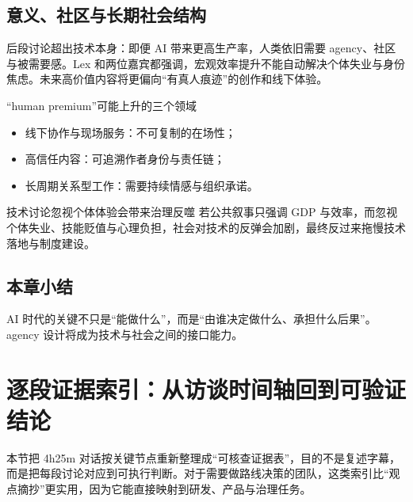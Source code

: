 \documentclass[a4paper]{article}
\begin{document}
\subsection{意义、社区与长期社会结构}

后段讨论超出技术本身：即便 AI 带来更高生产率，人类依旧需要 agency、社区与被需要感。Lex 和两位嘉宾都强调，宏观效率提升不能自动解决个体失业与身份焦虑。未来高价值内容将更偏向“有真人痕迹”的创作和线下体验。

\begin{knowledgebox}{“human premium”可能上升的三个领域}
\begin{itemize}[leftmargin=1.5em]
    \item 线下协作与现场服务：不可复制的在场性；
    \item 高信任内容：可追溯作者身份与责任链；
    \item 长周期关系型工作：需要持续情感与组织承诺。
\end{itemize}
\end{knowledgebox}

\begin{warningbox}{技术讨论忽视个体体验会带来治理反噬}
若公共叙事只强调 GDP 与效率，而忽视个体失业、技能贬值与心理负担，社会对技术的反弹会加剧，最终反过来拖慢技术落地与制度建设。
\end{warningbox}

\subsection{本章小结}

AI 时代的关键不只是“能做什么”，而是“由谁决定做什么、承担什么后果”。agency 设计将成为技术与社会之间的接口能力。

\section{逐段证据索引：从访谈时间轴回到可验证结论}

本节把 4h25m 对话按关键节点重新整理成“可核查证据表”，目的不是复述字幕，而是把每段讨论对应到可执行判断。对于需要做路线决策的团队，这类索引比“观点摘抄”更实用，因为它能直接映射到研发、产品与治理任务。
\end{document}
